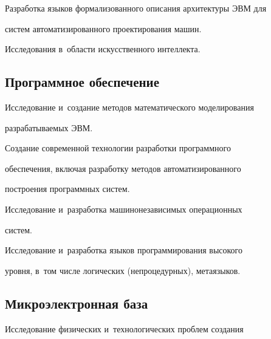      Разработка языков формализованного описания архитектуры ЭВМ для 

сис\-тем автоматизированного проектирования машин.

     

     Исследования в~об\-ласти искусственного интеллекта.

     

     \vspace*{-3pt}

     

     \subsection*{Программное обеспечение}

     

     \vspace*{-3pt}

     

     Исследование и~создание методов математического моделирования  

раз\-ра\-ба\-ты\-ва\-емых ЭВМ.

     

     Создание современной технологии разработки программного 

обеспечения, включая разработку методов автоматизированного  

по\-стро\-ения программных сис\-тем.

     

     Исследование и~разработка машинонезависимых операционных  

сис\-тем.

     

     Исследование и~разработка языков программирования высокого  

уров\-ня, в~том чис\-ле логических (непроцедурных), метаязыков.



\vspace*{-6pt}

     

     \subsection*{Микроэлектронная база}

     

     \vspace*{-3pt}

     

     Исследование физических и~технологических проб\-лем создания 

